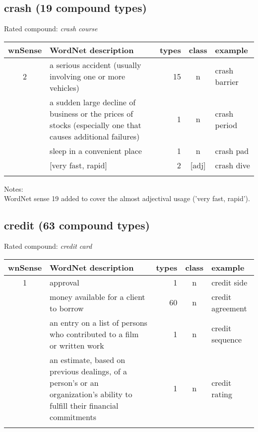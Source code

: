\subsection{crash       (19 compound types)}
Rated compound: \emph{crash course}


\vspace*{1ex}

\noindent
\begin{longtable}{c>{\raggedright\arraybackslash}p{5cm}rc>{\raggedright\arraybackslash}p{2cm}}\lsptoprule
{\small wnSense}&WordNet description&types&class&example\\\midrule
2&a serious accident (usually involving one or more
vehicles)&15&n&crash barrier\\\tablevspace
3&a sudden large decline of business or the prices of stocks (especially one that causes additional failures)&1&n&crash period\\\tablevspace
18&sleep in a convenient place&1&n&crash pad\\\tablevspace
19&{}[very fast, rapid]&2&{}[adj]&crash dive\\\lspbottomrule
\end{longtable}

\noindent
Notes:\\ WordNet sense 19 added to cover the almost adjectival usage
('very fast, rapid').

\subsection{credit       (63 compound types)}
Rated compound: \emph{credit card}





\vspace*{1ex}

\noindent
\begin{longtable}{c>{\raggedright\arraybackslash}p{5cm}rc>{\raggedright\arraybackslash}p{2cm}}\lsptoprule
{\small wnSense}&WordNet description&types&class&example\\\midrule
1&approval&1&n&credit side\\\tablevspace
2&money available for a client to borrow&60&n&credit agreement\\\tablevspace
8&an entry on a list of persons who contributed to a film or written work&1&n&credit sequence\\\tablevspace
9&an estimate, based on previous dealings, of a person's or an organization's ability to fulfill their financial commitments&1&n&credit rating\\\lspbottomrule
\end{longtable}

